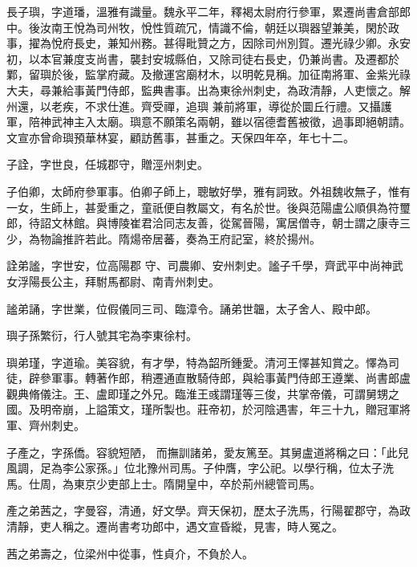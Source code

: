 \begin{pinyinscope}
 長子璵，字道璠，溫雅有識量。魏永平二年，釋褐太尉府行參軍，累遷尚書倉部郎中。後汝南王悅為司州牧，悅性質疏冗，情識不倫，朝廷以璵器望兼美，閑於政事，擢為悅府長史，兼知州務。甚得毗贊之方，因除司州別賀。遷光祿少卿。永安初，以本官兼度支尚書，襲封安城縣伯，又除司徒右長史，仍兼尚書。及遷都於鄴，留璵於後，監掌府藏。及撤運宮廟材木，以明乾見稱。加征南將軍、金紫光祿大夫，尋兼給事黃門侍郎，監典書事。出為東徐州刺史，為政清靜，人吏懷之。解州還，以老疾，不求仕進。齊受禪，追璵
 兼前將軍，導從於圜丘行禮。又攝護軍，陪神武神主入太廟。璵意不願策名兩朝，雖以宿德耆舊被徵，過事即絕朝請。文宣亦曾命璵預華林宴，顧訪舊事，甚重之。天保四年卒，年七十二。



 子詮，字世良，任城郡守，贈涇州刺史。



 子伯卿，太師府參軍事。伯卿子師上，聰敏好學，雅有詞致。外祖魏收無子，惟有一女，生師上，甚愛重之，童祇便自教屬文，有名於世。後與范陽盧公順俱為符璽郎，待詔文林館。與博陵崔君洽同志友善，從駕晉陽，寓居僧寺，朝士謂之康寺三少，為物論推許若此。隋煬帝居蕃，奏為王府記室，終於揚州。



 詮弟謐，字世安，位高陽郡
 守、司農卿、安州刺史。謐子千學，齊武平中尚神武女浮陽長公主，拜駙馬都尉、南青州刺史。



 謐弟誦，字世業，位假儀同三司、臨漳令。誦弟世韞，太子舍人、殿中郎。



 璵子孫繁衍，行人號其宅為李東徐村。



 璵弟瑾，字道瑜。美容貌，有才學，特為韶所鍾愛。清河王懌甚知賞之。懌為司徒，辟參軍事。轉著作郎，稍遷通直散騎侍郎，與給事黃門侍郎王遵業、尚書郎盧觀典脩儀注。王、盧即瑾之外兄。臨淮王彧謂瑾等三俊，共掌帝儀，可謂舅甥之國。及明帝崩，上謚策文，瑾所製也。莊帝初，於河陰遇害，年三十九，贈冠軍將軍、齊州刺史。



 子產之，字孫僑。容貌短陋，
 而撫訓諸弟，愛友篤至。其舅盧道將稱之曰：「此兒風調，足為李公家孫。」位北豫州司馬。子仲膺，字公祀。以學行稱，位太子洗馬。仕周，為東京少吏部上士。隋開皇中，卒於荊州總管司馬。



 產之弟茜之，字曼容，清通，好文學。齊天保初，歷太子洗馬，行陽翟郡守，為政清靜，吏人稱之。遷尚書考功郎中，遇文宣昏縱，見害，時人冤之。



 茜之弟壽之，位梁州中從事，性貞介，不負於人。




\end{pinyinscope}
